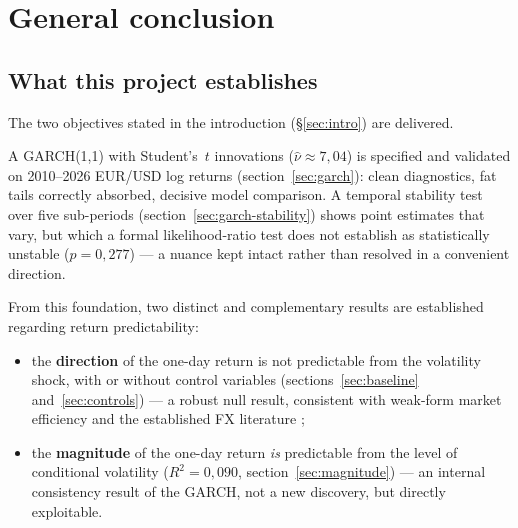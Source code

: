 \documentclass[12pt,a4paper]{article}
\begin{document}
	\newpage
	
	\section{General conclusion}
	\label{sec:conclusion}
	
	\subsection{What this project establishes}
	
	The two objectives stated in the introduction (\S\ref{sec:intro}) are
	delivered.
	
	\begin{econbox} 
		
		A GARCH(1,1) with Student's~$t$ innovations
		($\hat\nu \approx 7{,}04$) is specified and validated on
		2010--2026 EUR/USD log returns (section~\ref{sec:garch}): clean
		diagnostics, fat tails correctly absorbed, decisive model
		comparison. A temporal stability test over five sub-periods
		(section~\ref{sec:garch-stability}) shows point estimates
		that vary, but which a formal likelihood-ratio test
		does not establish as statistically unstable ($p=0{,}277$) --- a
		nuance kept intact rather than resolved in a convenient
		direction.
		
		From this foundation, two distinct and complementary results are
		established regarding return predictability:
		\begin{itemize}
			\item the \textbf{direction} of the one-day return is not
			predictable from the volatility shock, with or without
			control variables (sections~\ref{sec:baseline} and~\ref{sec:controls}) --- a
			robust null result, consistent with weak-form market
			efficiency and the established FX literature
			\citep{meeserogoff1983,fama1984};
			\item the \textbf{magnitude} of the one-day return \emph{is}
			predictable from the level of conditional volatility
			($R^2=0{,}090$, section~\ref{sec:magnitude}) --- an internal
			consistency result of the GARCH, not a new discovery, but
			directly exploitable.
		\end{itemize}
	\end{econbox}
	
	\vspace{0.3cm}
	
\end{document}
